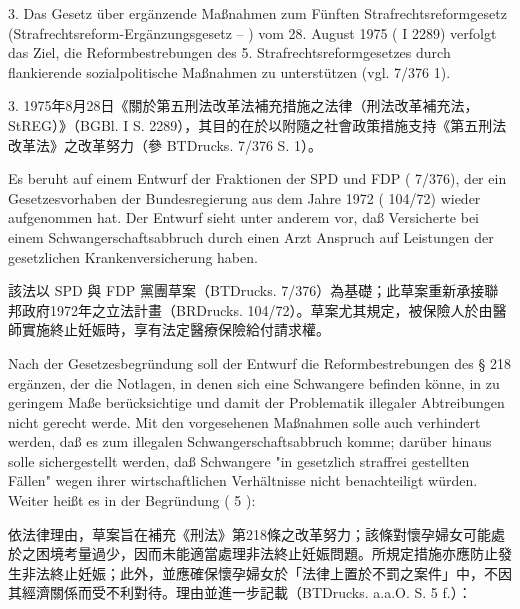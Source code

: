 \documentclass[12pt]{article}
\begin{document}
\begin{sourcepara}[title={原文理由 A.I.3}]
3. Das Gesetz über ergänzende Maßnahmen zum Fünften Strafrechtsreformgesetz (Strafrechtsreform-Ergänzungsgesetz -- \abbrStREG{}) vom 28. August 1975 (\abbrBGBl{} I \abbrS{} 2289) verfolgt das Ziel, die Reformbestrebungen des 5. Strafrechtsreformgesetzes durch flankierende sozialpolitische Maßnahmen zu unterstützen (vgl. \abbrBTDrucks{} 7/376 \abbrS{} 1).
\end{sourcepara}
\begin{transpara}
3. 1975年8月28日《關於第五刑法改革法補充措施之法律（刑法改革補充法，StREG）》（BGBl. I S. 2289），其目的在於以附隨之社會政策措施支持《第五刑法改革法》之改革努力（參 BTDrucks. 7/376 S. 1）。
\end{transpara}

\begin{sourcepara}[title={原文理由 A.I.3} Rn 18]
Es beruht auf einem Entwurf der Fraktionen der SPD und FDP (\abbrBTDrucks{} 7/376), der ein Gesetzesvorhaben der Bundesregierung aus dem Jahre 1972 (\abbrBRDrucks{} 104/72) wieder aufgenommen hat. Der Entwurf sieht unter anderem vor, daß Versicherte bei einem Schwangerschaftsabbruch durch einen Arzt Anspruch auf Leistungen der gesetzlichen Krankenversicherung haben.
\end{sourcepara}
\begin{transpara}
該法以 SPD 與 FDP 黨團草案（BTDrucks. 7/376）為基礎；此草案重新承接聯邦政府1972年之立法計畫（BRDrucks. 104/72）。草案尤其規定，被保險人於由醫師實施終止妊娠時，享有法定醫療保險給付請求權。
\end{transpara}

\begin{sourcepara}[title={原文理由 A.I.3} Rn 19]
Nach der Gesetzesbegründung soll der Entwurf die Reformbestrebungen des § 218 \abbrStGB{} ergänzen, der die Notlagen, in denen sich eine Schwangere befinden könne, in zu geringem Maße berücksichtige und damit der Problematik illegaler Abtreibungen nicht gerecht werde. Mit den vorgesehenen Maßnahmen solle auch verhindert werden, daß es zum illegalen Schwangerschaftsabbruch komme; darüber hinaus solle sichergestellt werden, daß Schwangere "in gesetzlich straffrei gestellten Fällen" wegen ihrer wirtschaftlichen Verhältnisse nicht benachteiligt würden. Weiter heißt es in der Begründung (\abbrBTDrucks{} \abbrAAO{} \abbrS{} 5 \abbrF{}):
\end{sourcepara}
\begin{transpara}
依法律理由，草案旨在補充《刑法》第218條之改革努力；該條對懷孕婦女可能處於之困境考量過少，因而未能適當處理非法終止妊娠問題。所規定措施亦應防止發生非法終止妊娠；此外，並應確保懷孕婦女於「法律上置於不罰之案件」中，不因其經濟關係而受不利對待。理由並進一步記載（BTDrucks. a.a.O. S. 5 f.）：
\end{transpara}
\end{document}
